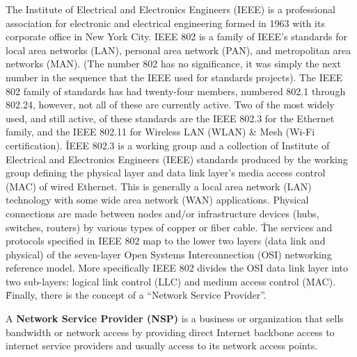 The Institute of Electrical and Electronics Engineers (IEEE) is a professional association for electronic and
electrical engineering formed in 1963 with its corporate office in New York City. IEEE 802 is a family of IEEE's
standards for local area networks (LAN), personal area network (PAN), and metropolitan area networks (MAN). (The
number 802 has no significance, it was simply the next number in the sequence that the IEEE used for standards
projects). The IEEE 802 family of standards has had twenty-four members, numbered 802.1 through 802.24, however, not
all of these are currently active. Two of the most widely used, and still active, of these standards are the IEEE 802.3
for the Ethernet family, and the IEEE 802.11 for Wireless LAN (WLAN) \& Mesh (Wi-Fi certification). \v

IEEE 802.3 is a working group and a collection of Institute of Electrical and Electronics Engineers (IEEE) standards
produced by the working group defining the physical layer and data link layer's media access control (MAC) of wired
Ethernet. This is generally a local area network (LAN) technology with some wide area network (WAN) applications.
Physical connections are made between nodes and/or infrastructure devices (hubs, switches, routers) by various types
of copper or fiber cable. \v

The services and protocols specified in IEEE 802 map to the lower two layers (data link and physical) of the
seven-layer Open Systems Interconnection (OSI) networking reference model. More specifically IEEE 802 divides the OSI
data link layer into two sub-layers: logical link control (LLC) and medium access control (MAC). \v

Finally, there is the concept of a ``Network Service Provider''.

A \textbf{Network Service Provider (NSP)} is a business or organization that sells bandwidth or network access by
providing direct Internet backbone access to internet service providers and usually access to its network access
points.
\ed